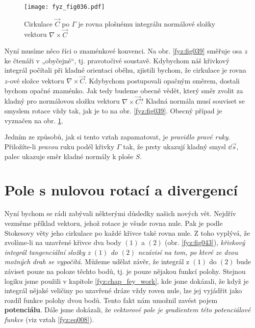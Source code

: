     \begin{figure}[ht!]  %
      \centering
      \texttt{[image: fyz\_fig036.pdf]}
      \caption{Cirkulace \(\vec{C}\) po \(\Gamma\) je rovna plošnému integrálu normálové složky
        vektoru \(\nabla\times\vec{C}\)}
      \label{fyz:fig036}   
    \end{figure} 
    Nyní musíme něco říci o znaménkové konvenci. Na obr. \ref{fyz:fig039} směřuje osa 
    \(z\) ke čtenáři v „obyčejné“, tj. pravotočivé soustavě. Kdybychom náš křivkový integrál 
    počítali při kladné orientaci oběhu, zjistili bychom, že cirkulace je rovna \(z\)-ové složce 
    vektoru \(\nabla\times\vec{C}\). Kdybychom postupovali opačným směrem, dostali bychom opačné 
    znaménko. Jak tedy budeme obecně vědět, který směr zvolit za kladný pro normálovou složku 
    vektoru \(\nabla\times\vec{C}\)? Kladná normála musí souviset se smyslem rotace vždy tak, jak 
    je to na obr. \ref{fyz:fig039}. Obecný případ je vyznačen na obr. \ref{fyz:fig036}.

    Jedním ze způsobů, jak si tento vztah zapamatovat, je \emph{pravidlo pravé ruky}. Přiložíte-li
    \emph{pravou} ruku podél křivky \(\Gamma\) tak, že prsty ukazují kladný smysl \(\dd{\vec{s}}\), 
    palec ukazuje směr kladné normály k ploše \(S\).


  \section{Pole s nulovou rotací a divergencí}\label{fyz:IIchapIIIsecVI}
    Nyní bychom se rádi zabývali některými důsledky našich nových vět. Nejdřív vezměme příklad 
    vektoru, jehož rotace je všude rovna nule. Pak je podle Stokesovy věty jeho cirkulace po každé 
    křivce také rovna nule. Z toho vyplývá, že zvolíme-li na uzavřené křivce dva body \((1)\) a 
    \((2)\) (obr. \ref{fyz:fig043}), \emph{křivkový integrál tangenciální složky z \((1)\) do 
    \((2)\) nezávisí na tom, po které ze dvou možných drah se vypočítá.} Můžeme udělat závěr, že 
    integrál z \((1)\) do \((2)\) bude záviset pouze na poloze těchto bodů, tj. je pouze nějakou 
    funkcí polohy. Stejnou logiku jsme použili v kapitole \ref{fyz:chap_fey_work}, kde jsme 
    dokázali, že když je integrál nějaké veličiny po uzavřené dráze vždy roven nule, lze jej 
    vyjádřit jako rozdíl funkce polohy dvou bodů. Tento fakt nám umožnil zavést pojem 
    \textbf{potenciálu}. Dále jsme dokázali, že \emph{vektorové pole je gradientem této 
    potenciálové funkce} (viz vztah \ref{fyz:eq008}).

